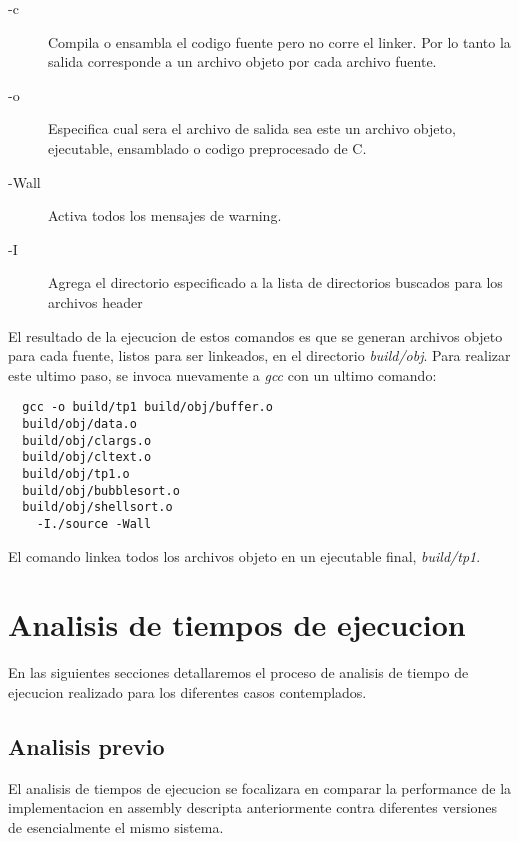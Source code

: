 \documentclass[a4paper,11pt]{article}
\begin{document}
\begin{description}

  \item[-c] Compila o ensambla el codigo fuente pero no corre el linker.  Por
    lo tanto la salida corresponde a un archivo objeto por cada archivo fuente.

  \item[-o] Especifica cual sera el archivo de salida sea este un archivo
    objeto, ejecutable, ensamblado o codigo preprocesado de C.

  \item[-Wall] Activa todos los mensajes de warning.

  \item[-I] Agrega el directorio especificado a la lista de directorios
    buscados para los archivos header

\end{description}

  El resultado de la ejecucion de estos comandos es que se generan archivos
  objeto para cada fuente, listos para ser linkeados, en el directorio
  \textit{build/obj}. Para realizar este ultimo paso, se invoca nuevamente a
  \textit{gcc} con un ultimo comando:

\begin{lstlisting}
  gcc -o build/tp1 build/obj/buffer.o 
  build/obj/data.o 
  build/obj/clargs.o 
  build/obj/cltext.o 
  build/obj/tp1.o 
  build/obj/bubblesort.o 
  build/obj/shellsort.o 
    -I./source -Wall 
\end{lstlisting}

  El comando linkea todos los archivos objeto en un ejecutable final,
  \textit{build/tp1}.

\section{Analisis de tiempos de ejecucion}

  En las siguientes secciones detallaremos el proceso de analisis de tiempo de
  ejecucion realizado para los diferentes casos contemplados.

\subsection{Analisis previo}\label{sec:tiempos}

  El analisis de tiempos de ejecucion se focalizara en comparar la performance de
  la implementacion en assembly descripta anteriormente contra diferentes
  versiones de esencialmente el mismo sistema.
\end{document}
